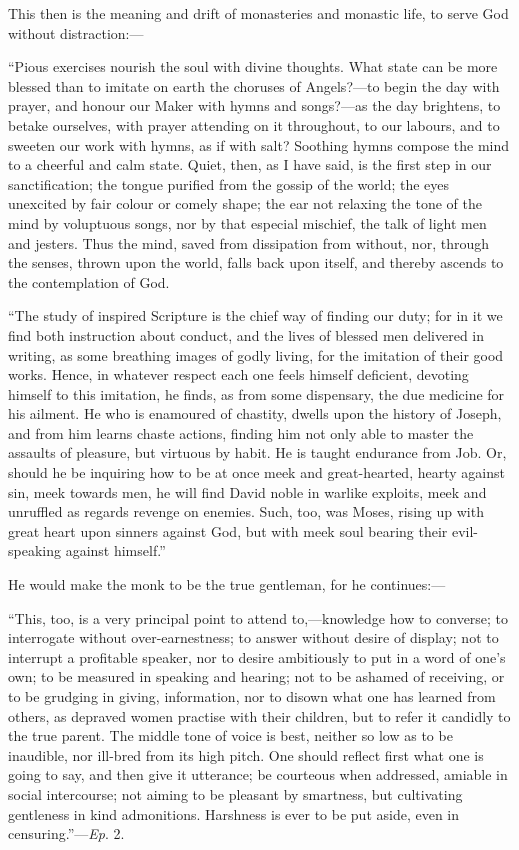 This then is the meaning and drift of monasteries and monastic
life, to serve God without distraction:—

``Pious exercises nourish the soul with divine thoughts. What
state can be more blessed than to imitate on earth the choruses of
Angels?—to begin the day with prayer, and honour our Maker with
hymns and songs?—as the day brightens, to betake ourselves, with
prayer attending on it throughout, to our labours, and to sweeten our
work with hymns, as if with salt? Soothing hymns compose the mind to a
cheerful and calm state. Quiet, then, as I have said, is the first
step in our sanctification; the tongue purified from the gossip of the
world; the eyes unexcited by fair colour or comely shape; the ear not
relaxing the tone of the mind by voluptuous songs, nor by that
especial mischief, the talk of light men and jesters. Thus the mind,
saved from dissipation from without, nor, through the senses, thrown
upon the world, falls back upon itself, and thereby ascends to the
contemplation of God.

``The study of inspired Scripture is the chief way of finding
our duty; for in it we find both instruction about conduct, and the
lives of blessed men delivered in writing, as some breathing images of
godly living, for the imitation of their good works. Hence, in
whatever respect each one feels himself deficient, devoting himself to
this imitation, he finds, as from some dispensary, the due medicine
for his ailment. He who is enamoured of chastity, dwells upon the
history of Joseph, and from him learns chaste actions, finding him not
only able to master the assaults of pleasure, but virtuous by habit.
He is taught endurance from Job. Or, should he be inquiring how to be
at once meek and great-hearted, hearty against sin, meek towards men,
he will find David noble in warlike exploits, meek and unruffled as
regards revenge on enemies. Such, too, was Moses, rising up with great
heart upon sinners against God, but with meek soul bearing their
evil-speaking against himself.''

He would make the monk to be the true gentleman, for he continues:—

``This, too, is a very principal point to attend to,—knowledge
how to converse; to interrogate without over-earnestness; to answer
without desire of display; not to interrupt a profitable speaker, nor
to desire ambitiously to put in a word of one's own; to be measured
in speaking and hearing; not to be ashamed of
receiving, or to be grudging in giving, information, nor to disown
what one has learned from others, as depraved women practise with
their children, but to refer it candidly to the true parent. The
middle tone of voice is best, neither so low as to be inaudible, nor
ill-bred from its high pitch. One should reflect first what one is
going to say, and then give it utterance; be courteous when addressed,
amiable in social intercourse; not aiming to be pleasant by smartness,
but cultivating gentleness in kind admonitions. Harshness is ever to
be put aside, even in censuring.''—\emph{Ep}. 2.


